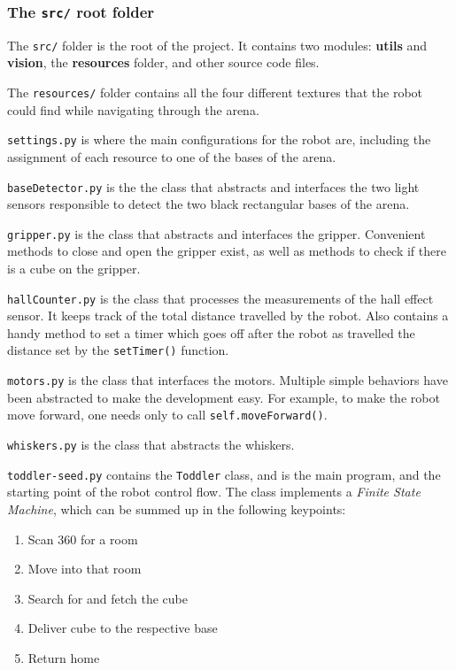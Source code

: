 \clearpage

\subsubsection{The \texttt{src/} root folder}

The \texttt{src/} folder is the root of the project. It contains two modules: \textbf{utils} and \textbf{vision}, the \textbf{resources} folder, and other source code files.

The \texttt{resources/} folder contains all the four different textures that the robot could find while navigating through the arena.

\texttt{settings.py} is where the main configurations for the robot are, including the assignment of each resource to one of the bases of the arena.

\texttt{baseDetector.py} is the the class that abstracts and interfaces the two light sensors responsible to detect the two black rectangular bases of the arena.

\texttt{gripper.py} is the class that abstracts and interfaces the gripper. Convenient methods to close and open the gripper exist, as well as methods to check if there is a cube on the gripper.

\texttt{hallCounter.py} is the class that processes the measurements of the hall effect sensor. It keeps track of the total distance travelled by the robot. Also contains a handy method to set a timer which goes off after the robot as travelled the distance set by the \texttt{setTimer()} function.

\texttt{motors.py} is the class that interfaces the motors. Multiple simple behaviors have been abstracted to make the development easy. For example, to make the robot move forward, one needs only to call \texttt{self.moveForward()}.

\texttt{whiskers.py} is the class that abstracts the whiskers.

\texttt{toddler-seed.py} contains the \texttt{Toddler} class, and is the main program, and the starting point of the robot control flow. The class implements a \textit{Finite State Machine}, which can be summed up in the following keypoints:

\medskip

\begin{enumerate}
    \centering
    \item Scan 360 for a room
    \item Move into that room
    \item Search for and fetch the cube
    \item Deliver cube to the respective base
    \item Return home
\end{enumerate}


